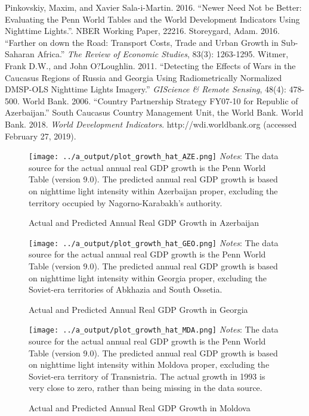 \documentclass[12pt,a4paper]{article}%
\begin{document}
\begin{thebibliography}{99}
\bibitem{} Pinkovskiy, Maxim, and Xavier Sala-i-Martin. 2016. ``Newer Need Not be Better: Evaluating the Penn World Tables and the World Development Indicators Using Nighttime Lights.''. NBER Working Paper, 22216.
\bibitem{} Storeygard, Adam. 2016. ``Farther on down the Road: Transport Costs, Trade and Urban Growth in Sub-Saharan Africa.'' \textit{The Review of Economic Studies}, 83(3): 1263-1295.
\bibitem{} Witmer, Frank D.W., and John O?Loughlin. 2011. ``Detecting the Effects of Wars in the Caucasus Regions of Russia and Georgia Using Radiometrically Normalized DMSP-OLS Nighttime Lights Imagery.'' \textit{GIScience \& Remote Sensing}, 48(4): 478-500.
\bibitem{} World Bank. 2006. ``Country Partnership Strategy FY07-10 for Republic of Azerbaijan.'' South Caucasus Country Management Unit, the World Bank.
\bibitem{} World Bank. 2018. \textit{World Development Indicators}. http://wdi.worldbank.org (accessed February 27, 2019).
\end{thebibliography}

\begin{figure}[ptb]
\caption{Actual and Predicted Annual Real GDP Growth in Azerbaijan}%
\label{aze}%
\texttt{[image: ../a\_output/plot\_growth\_hat\_AZE.png]}
{\scriptsize \textit{Notes}: 
	The data source for the actual annual real GDP growth is the Penn World Table (version 9.0). 
	The predicted annual real GDP growth is based on nighttime light intensity within Azerbaijan proper, excluding the territory occupied by Nagorno-Karabakh's authority. 
}
\end{figure}

\begin{figure}[ptb]
\caption{Actual and Predicted Annual Real GDP Growth in Georgia}%
\label{geo}%
\texttt{[image: ../a\_output/plot\_growth\_hat\_GEO.png]}
{\scriptsize \textit{Notes}: 
	The data source for the actual annual real GDP growth is the Penn World Table (version 9.0). 
	The predicted annual real GDP growth is based on nighttime light intensity within Georgia proper, excluding the Soviet-era territories of Abkhazia and South Ossetia. 
}
\end{figure}

\begin{figure}[ptb]
\caption{Actual and Predicted Annual Real GDP Growth in Moldova}%
\label{mda}%
\texttt{[image: ../a\_output/plot\_growth\_hat\_MDA.png]}
{\scriptsize \textit{Notes}: 
	The data source for the actual annual real GDP growth is the Penn World Table (version 9.0). 
	The predicted annual real GDP growth is based on nighttime light intensity within Moldova proper, excluding the Soviet-era territory of Transnistria. 
	The actual growth in 1993 is very close to zero, rather than being missing in the data source.
}
\end{figure}
\end{document}
